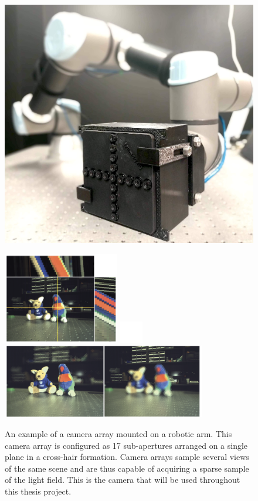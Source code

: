 \begin{figure}[tbp]
    \centering
    \includegraphics[width=4.5in]{images/robotcamera.jpg}
    \caption[An example of a camera array]{An example of a camera array mounted on a robotic arm. This camera array is configured as 17 sub-apertures arranged on a single plane in a cross-hair formation. Camera arrays sample several views of the same scene and are thus capable of acquiring a sparse sample of the light field. This is the camera that will be used throughout this thesis project.}
    \label{cameraarray}
    \vspace{1cm}
    \includegraphics[width=2in]{images/epipolarimage.png}
    \includegraphics[width=0.4in]{images/blank.png}
    \includegraphics[width=3.5in]{images/refocus.png}

\end{figure}
